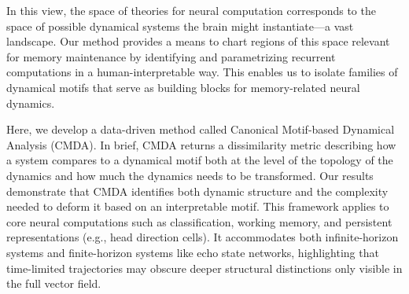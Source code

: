 \documentclass{article}
\theoremstyle{definition} \newtheorem{definition}{Definition}  \newtheorem{example}{Example}
\theoremstyle{remark} \newtheorem{remark}{Remark}
\newcounter{ct}
\begin{document}
In this view, the space of theories for neural computation corresponds to the space of possible dynamical systems the brain might instantiate—a vast landscape.
Our method provides a means to chart regions of this space relevant for memory maintenance by identifying and parametrizing recurrent computations in a human-interpretable way.
This enables us to isolate families of dynamical motifs that serve as building blocks for memory-related neural dynamics.
 
Here, we develop a data-driven method called Canonical Motif-based Dynamical Analysis (CMDA). 
In brief, CMDA returns a dissimilarity metric describing how a system compares to a dynamical motif both at the level of the topology of the dynamics and how much the dynamics needs to be transformed.
Our results demonstrate that CMDA identifies both dynamic structure and the complexity needed to deform it based on an interpretable motif.
This framework applies to core neural computations such as classification, working memory, and persistent representations (e.g., head direction cells).
It accommodates both infinite-horizon systems and finite-horizon systems like echo state networks, highlighting that time-limited trajectories may obscure deeper structural distinctions only visible in the full vector field.


 
\end{document}
